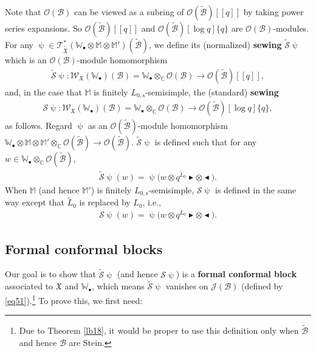 \documentclass[12pt,a4paper,notitlepage]{article}
\theoremstyle{definition}
\theoremstyle{plain}
\newcommand{\fk}{\mathfrak}
\newcommand{\mc}{\mathcal}
\newcommand{\wtd}{\widetilde}
\newcommand{\scr}{\mathscr}
\newcommand{\blt}{\bullet}
\newcommand{\Wbb}{\mathbb W}
\newcommand{\Mbb}{\mathbb M}
\newcommand{\Cbb}{\mathbb C}
\newcommand{\btl}{\blacktriangleleft}
\newcommand{\btr}{\blacktriangleright}
\newcommand{\Lss}{{L_{0,\mathrm{s}}}}
\numberwithin{equation}{section}
\begin{document}
Note that $\scr O(\mc B)$ can be viewed as a subring of $\scr O(\wtd{\mc B})[[q]]$ by taking power series expansions. So $\scr O(\wtd{\mc B})[[q]]$ and $\scr O(\wtd{\mc B})[\log q]\{q\}$ are $\scr O(\mc B)$-modules.  For any $\uppsi\in\scr T_{\wtd{\fk X}}^*(\Wbb_\blt\otimes\Mbb\otimes\Mbb')(\wtd{\mc B})$, we define its (normalized) \textbf{sewing} $\wtd{\mc S}\uppsi$ which is an $\scr O(\mc B)$-module homomorphism \index{S@$\wtd{\mc S}\uppsi,\mc S\uppsi$}
\begin{align*}
\wtd{\mc S}\uppsi:\scr W_{\fk X}(\Wbb_\blt)(\mc B)=\Wbb_\blt\otimes_\Cbb\scr O(\mc B)\rightarrow\scr O(\wtd{\mc B})[[q]],
\end{align*}
and, in the case that $\Mbb$ is finitely $\Lss$-semisimple, the (standard) \textbf{sewing}
\begin{align*}
\mc S\uppsi:\scr W_{\fk X}(\Wbb_\blt)(\mc B)=\Wbb_\blt\otimes_\Cbb\scr O(\mc B)\rightarrow\scr O(\wtd{\mc B})[\log q]\{q\},
\end{align*}
as follows. Regard $\uppsi$ as an $\scr O(\wtd{\mc B})$-module homomorphism $\Wbb_\blt\otimes\Mbb\otimes\Mbb'\otimes_\Cbb\scr O(\wtd{\mc B})\rightarrow \scr O(\wtd{\mc B})$. $\wtd{\mc S}\uppsi$ is defined such that for any  $w\in\Wbb_\blt\otimes_\Cbb\scr O(\wtd{\mc B})$,
\begin{align}
\wtd{\mc S}\uppsi(w)=\uppsi\big(w\otimes q^{\wtd L_0}\btr\otimes\btl\big).
\end{align}
When $\Mbb$ (and hence $\Mbb'$) is finitely $\Lss$-semisimple, $\mc S\uppsi$ is defined in the same way except that $\wtd L_0$ is replaced by $L_0$, i.e.,
\begin{align}
{\mc S}\uppsi(w)=\uppsi\big(w\otimes q^{L_0}\btr\otimes\btl\big).\label{eq105}
\end{align}



\subsection*{Formal conformal blocks}

Our goal is to show that $\wtd{\mc S}\uppsi$ (and hence $\mc S\uppsi$) is a \textbf{formal conformal block} associated to $\fk X$ and $\Wbb_\blt$, which means $\wtd{\mc S}\uppsi$ vanishes on $\scr J(\mc B)$ (defined by \eqref{eq51}).\footnote{Due to Theorem \ref{lb18}, it would be proper to use this definition only when $\wtd{\mc B}$ and hence $\mc B$ are Stein.} To prove this, we first need:
\end{document}
